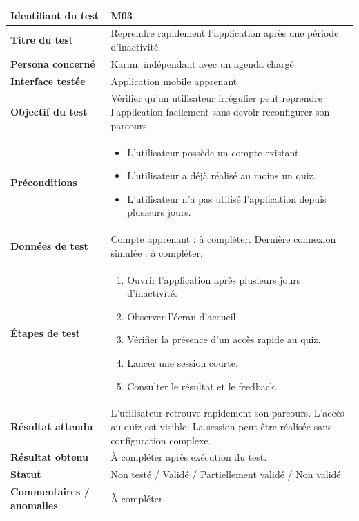 \begin{longtable}{|p{4cm}|p{10cm}|}
\textbf{Identifiant du test} & M03 \\ \hline
\textbf{Titre du test} & Reprendre rapidement l'application après une période d'inactivité \\ \hline
\textbf{Persona concerné} & Karim, indépendant avec un agenda chargé \\ \hline
\textbf{Interface testée} & Application mobile apprenant \\ \hline
\textbf{Objectif du test} & Vérifier qu'un utilisateur irrégulier peut reprendre l'application facilement sans devoir reconfigurer son parcours. \\ \hline
\textbf{Préconditions} &
\begin{itemize}
    \item L'utilisateur possède un compte existant.
    \item L'utilisateur a déjà réalisé au moins un quiz.
    \item L'utilisateur n'a pas utilisé l'application depuis plusieurs jours.
\end{itemize}
\\ \hline
\textbf{Données de test} & 
Compte apprenant : à compléter. \newline
Dernière connexion simulée : à compléter. \\ \hline
\textbf{Étapes de test} &
\begin{enumerate}
    \item Ouvrir l'application après plusieurs jours d'inactivité.
    \item Observer l'écran d'accueil.
    \item Vérifier la présence d'un accès rapide au quiz.
    \item Lancer une session courte.
    \item Consulter le résultat et le feedback.
\end{enumerate}
\\ \hline
\textbf{Résultat attendu} & 
L'utilisateur retrouve rapidement son parcours. L'accès au quiz est visible. La session peut être réalisée sans configuration complexe. \\ \hline
\textbf{Résultat obtenu} & À compléter après exécution du test. \\ \hline
\textbf{Statut} & Non testé / Validé / Partiellement validé / Non validé \\ \hline
\textbf{Commentaires / anomalies} & À compléter. \\
\end{longtable}
\endgroup

